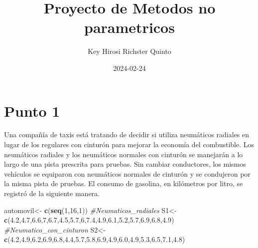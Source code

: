 \documentclass[
]{article}
\title{Proyecto de Metodos no parametricos}
\author{Key Hirosi Richster Quinto}
\date{2024-02-24}
\newenvironment{Shaded}{\begin{snugshade}}{\end{snugshade}}
\newcommand{\CommentTok}[1]{\textcolor[rgb]{0.56,0.35,0.01}{\textit{#1}}}
\newcommand{\DecValTok}[1]{\textcolor[rgb]{0.00,0.00,0.81}{#1}}
\newcommand{\FloatTok}[1]{\textcolor[rgb]{0.00,0.00,0.81}{#1}}
\newcommand{\FunctionTok}[1]{\textcolor[rgb]{0.13,0.29,0.53}{\textbf{#1}}}
\newcommand{\NormalTok}[1]{#1}
\newcommand{\OtherTok}[1]{\textcolor[rgb]{0.56,0.35,0.01}{#1}}
\begin{document}
\maketitle

{
\setcounter{tocdepth}{2}
\tableofcontents
}
\pretitle{\begin{center}\LARGE\bfseries}
\posttitle{\end{center}\vspace{2em}}

\begin{titlingpage}
\maketitle
\end{titlingpage}

\newpage

\hypertarget{punto-1}{%
\section{Punto 1}\label{punto-1}}

Una compañía de taxis está tratando de decidir si utiliza neumáticos
radiales en lugar de los regulares con cinturón para mejorar la economía
del combustible. Los neumáticos radiales y los neumáticos normales con
cinturón se manejarán a lo largo de una pista prescrita para pruebas.
Sin cambiar conductores, los mismos vehículos se equiparon con
neumáticos normales de cinturón y se condujeron por la misma pista de
pruebas. El consumo de gasolina, en kilómetros por litro, se registró de
la siguiente manera.

\begin{Shaded}
\begin{Highlighting}[]
\NormalTok{automovil}\OtherTok{\textless{}{-}} \FunctionTok{c}\NormalTok{(}\FunctionTok{seq}\NormalTok{(}\DecValTok{1}\NormalTok{,}\DecValTok{16}\NormalTok{,}\DecValTok{1}\NormalTok{))}
\CommentTok{\#Neumaticos\_radiales}
\NormalTok{S1}\OtherTok{\textless{}{-}}\FunctionTok{c}\NormalTok{(}\FloatTok{4.2}\NormalTok{,}\FloatTok{4.7}\NormalTok{,}\FloatTok{6.6}\NormalTok{,}\DecValTok{7}\NormalTok{,}\FloatTok{6.7}\NormalTok{,}\FloatTok{4.5}\NormalTok{,}\FloatTok{5.7}\NormalTok{,}\DecValTok{6}\NormalTok{,}\FloatTok{7.4}\NormalTok{,}\FloatTok{4.9}\NormalTok{,}\FloatTok{6.1}\NormalTok{,}\FloatTok{5.2}\NormalTok{,}\FloatTok{5.7}\NormalTok{,}\FloatTok{6.9}\NormalTok{,}\FloatTok{6.8}\NormalTok{,}\FloatTok{4.9}\NormalTok{)}
\CommentTok{\#Neumatico\_con\_cinturon}
\NormalTok{S2}\OtherTok{\textless{}{-}}\FunctionTok{c}\NormalTok{(}\FloatTok{4.2}\NormalTok{,}\FloatTok{4.9}\NormalTok{,}\FloatTok{6.2}\NormalTok{,}\FloatTok{6.9}\NormalTok{,}\FloatTok{6.8}\NormalTok{,}\FloatTok{4.4}\NormalTok{,}\FloatTok{5.7}\NormalTok{,}\FloatTok{5.8}\NormalTok{,}\FloatTok{6.9}\NormalTok{,}\FloatTok{4.9}\NormalTok{,}\FloatTok{6.0}\NormalTok{,}\FloatTok{4.9}\NormalTok{,}\FloatTok{5.3}\NormalTok{,}\FloatTok{6.5}\NormalTok{,}\FloatTok{7.1}\NormalTok{,}\FloatTok{4.8}\NormalTok{)}
\end{Highlighting}
\end{Shaded}
\end{document}
